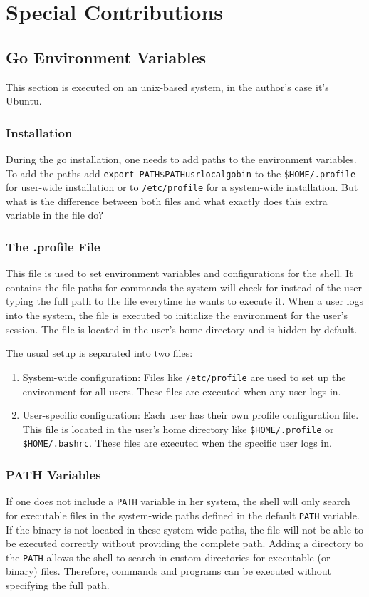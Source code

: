 \chapter{Special Contributions}
\label{ch:special_contributions}

\section{Go Environment Variables}
This section is executed on an unix-based system, in the author's case it's Ubuntu.

\subsection{Installation}
During the go installation, one needs to add paths to the environment variables.
To add the paths add \texttt{export PATH\=\$PATH\:\/usr\/local\/go\/bin} 
to the \texttt{\$HOME/.profile} for user-wide installation or to \texttt{/etc/profile} for a system-wide installation.
But what is the difference between both files and what exactly does this extra variable in the file do?

\subsection{The .profile File}
This file is used to set environment variables and configurations for the shell.
It contains the file paths for commands the system will check for instead of the user typing the full path to the file everytime he wants to execute it.
When a user logs into the system, the file is executed to initialize the environment for the user's session.
The file is located in the user's home directory and is hidden by default.

The usual setup is separated into two files:
\begin{enumerate}
    \item System-wide configuration:
        Files like \texttt{/etc/profile} are used to set up the environment for all users.
        These files are executed when any user logs in.
    \item User-specific configuration:
        Each user has their own profile configuration file.
        This file is located in the user's home directory like \texttt{\$HOME/.profile} or \texttt{\$HOME/.bashrc}.
        These files are executed when the specific user logs in.
\end{enumerate}

\subsection{PATH Variables}
If one does not include a \texttt{PATH} variable in her system, the shell will only search for executable files in the system-wide paths defined in the default \texttt{PATH} variable.
If the binary is not located in these system-wide paths, the file will not be able to be executed correctly without providing the complete path.
Adding a directory to the \texttt{PATH} allows the shell to search in custom directories for executable (or binary) files.
Therefore, commands and programs can be executed without specifying the full path.

